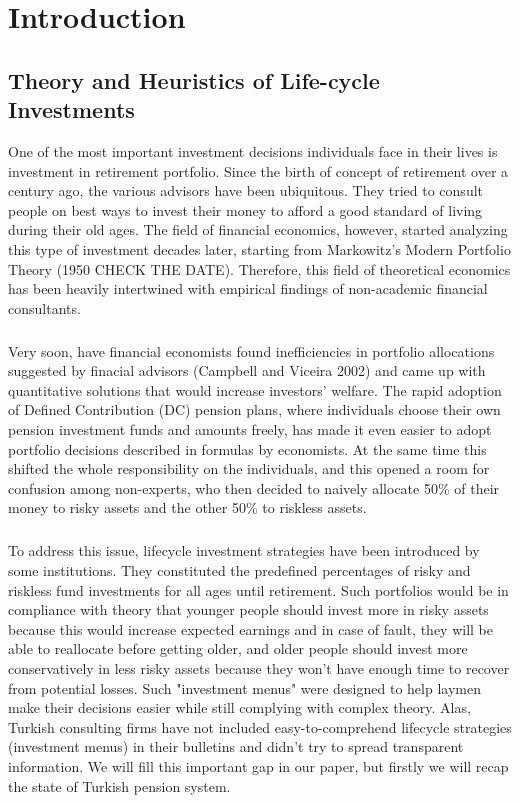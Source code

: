 \chapter{Introduction} %
\label{intro} %


\section{Theory and Heuristics of Life-cycle Investments}
One of the most important investment decisions individuals face in their lives is investment in retirement portfolio. Since the birth of concept of retirement over a century ago, the various advisors have been ubiquitous. They tried to consult people on best ways to invest their money to afford a good standard of living during their old ages. The field of financial economics, however, started analyzing this type of investment decades later, starting from Markowitz's Modern Portfolio Theory (1950 CHECK THE DATE). Therefore, this field of theoretical economics has been heavily intertwined with empirical findings of non-academic financial consultants.
\paragraph*{}
Very soon, have financial economists found inefficiencies in portfolio allocations suggested by finacial advisors (Campbell and Viceira 2002) and came up with quantitative solutions that would increase investors' welfare. The rapid adoption of Defined Contribution (DC) pension plans, where individuals choose their own pension investment funds and amounts freely, has made it even easier to adopt portfolio decisions described in formulas by economists. At the same time this shifted the whole responsibility on the individuals, and this opened a room for confusion among non-experts, who then decided to naively allocate 50\% of their money to risky assets and the other 50\% to riskless assets.
\paragraph*{} 
To address this issue, lifecycle investment strategies have been introduced by some institutions. They constituted the predefined percentages of risky and riskless fund investments for all ages until retirement. Such portfolios would be in compliance with theory that younger people should invest more in risky assets because this would increase expected earnings and in case of fault, they will be able to reallocate before getting older, and older people should invest more conservatively in less risky assets because they won't have enough time to recover from potential losses. Such "investment menus" were designed to help laymen make their decisions easier while still complying with complex theory. Alas, Turkish consulting firms have not included easy-to-comprehend lifecycle strategies (investment menus) in their bulletins and didn't try to spread transparent information. We will fill this important gap in our paper, but firstly we will recap the state of Turkish pension system.

